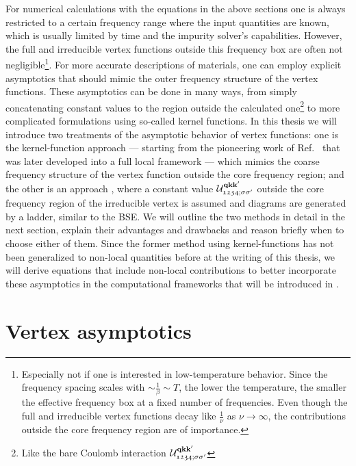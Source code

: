 \documentclass[../../main.tex]{subfiles}
\begin{document}
For numerical calculations with the equations in the above sections one is always restricted to a certain frequency range where the input quantities are known, which is usually limited by time and the impurity solver's capabilities. However, the full and irreducible vertex functions outside this  frequency box are often not negligible\footnote{Especially not if one is interested in low-temperature behavior. Since the frequency spacing scales with $\sim\frac1\beta\sim T$, the lower the temperature, the smaller the effective frequency box at a fixed number of frequencies. Even though the full and irreducible vertex functions decay like $\frac{1}{\nu}$ as $\nu\to\infty$, the contributions outside the core frequency region are of importance.}. For more accurate descriptions of materials, one can employ explicit asymptotics that should mimic the outer frequency structure of the vertex functions. These asymptotics can be done in many ways, from simply concatenating constant values to the region outside the calculated one\footnote{Like the bare Coulomb interaction $\mathcal{U}^{\textbf{qkk}'}_{\mathfrak{1234};\sigma\sigma'}$} to more complicated formulations using so-called kernel functions. In this thesis we will introduce two treatments of the asymptotic behavior of vertex functions: one is the kernel-function approach --- starting from the pioneering work of Ref.~\cite{Kunes2011} that was later developed into a full local framework \cite{Wentzell2020, Tagliavini2018, Li2016, Hummel2014, Kaufmann2017a, Kaufmann2017} --- which mimics the coarse frequency structure of the vertex function outside the core frequency region; and the other is an  approach \cite{Kitatani2022}, where a constant value $\mathcal{U}^{\textbf{qkk}'}_{\mathfrak{1234};\sigma\sigma'}$ outside the core frequency region of the irreducible vertex is assumed and diagrams are generated by a ladder, similar to the BSE. We will outline the two methods in detail in the next section, explain their advantages and drawbacks and reason briefly when to choose either of them. Since the former method using kernel-functions has not been generalized to non-local quantities before at the writing of this thesis, we will derive equations that include non-local contributions to better incorporate these asymptotics in the computational frameworks that will be introduced in . 

\section{Vertex asymptotics}\label{sec:vertex_asymptotics}
\end{document}
